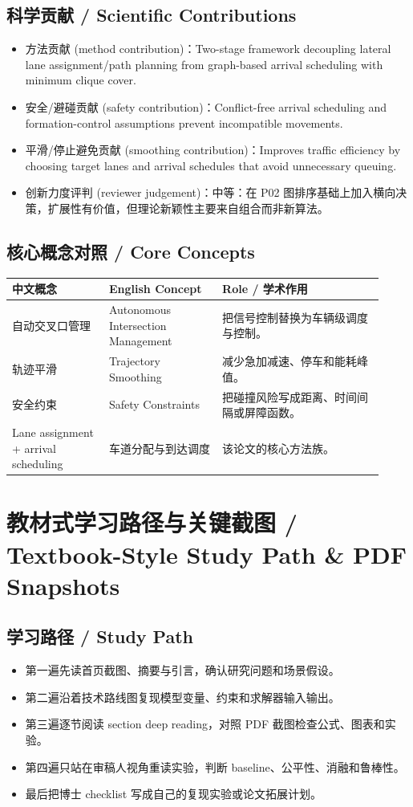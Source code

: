 \documentclass[UTF8,a4paper,11pt,fontset=fandol]{ctexart}
\begin{document}
\subsection{科学贡献 / Scientific Contributions}
\begin{itemize}
\item 方法贡献 (method contribution)：Two-stage framework decoupling lateral lane assignment/path planning from graph-based arrival scheduling with minimum clique cover.
\item 安全/避碰贡献 (safety contribution)：Conflict-free arrival scheduling and formation-control assumptions prevent incompatible movements.
\item 平滑/停止避免贡献 (smoothing contribution)：Improves traffic efficiency by choosing target lanes and arrival schedules that avoid unnecessary queuing.
\item 创新力度评判 (reviewer judgement)：中等：在 P02 图排序基础上加入横向决策，扩展性有价值，但理论新颖性主要来自组合而非新算法。
\end{itemize}


\subsection{核心概念对照 / Core Concepts}
\begin{longtable}{p{0.24\linewidth}p{0.28\linewidth}p{0.40\linewidth}}
\toprule
中文概念 & English Concept & Role / 学术作用\\
\midrule
自动交叉口管理 & Autonomous Intersection Management & 把信号控制替换为车辆级调度与控制。 \\
轨迹平滑 & Trajectory Smoothing & 减少急加减速、停车和能耗峰值。 \\
安全约束 & Safety Constraints & 把碰撞风险写成距离、时间间隔或屏障函数。 \\
Lane assignment + arrival scheduling & 车道分配与到达调度 & 该论文的核心方法族。 \\
\bottomrule
\end{longtable}

\section{教材式学习路径与关键截图 / Textbook-Style Study Path \& PDF Snapshots}
\subsection{学习路径 / Study Path}
\begin{itemize}
\item 第一遍先读首页截图、摘要与引言，确认研究问题和场景假设。
\item 第二遍沿着技术路线图复现模型变量、约束和求解器输入输出。
\item 第三遍逐节阅读 section deep reading，对照 PDF 截图检查公式、图表和实验。
\item 第四遍只站在审稿人视角重读实验，判断 baseline、公平性、消融和鲁棒性。
\item 最后把博士 checklist 写成自己的复现实验或论文拓展计划。
\end{itemize}
\end{document}
